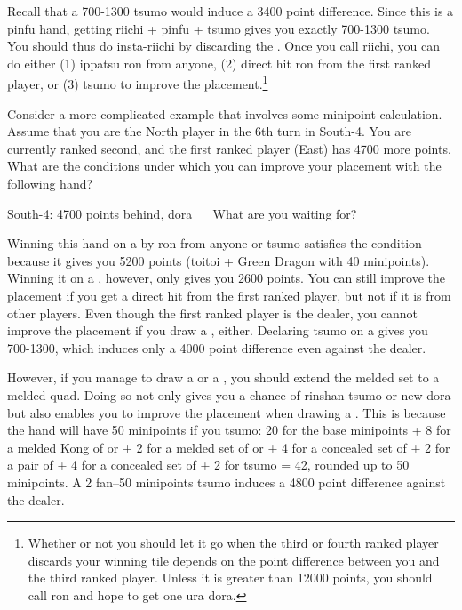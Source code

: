\bigskip
Recall that a 700-1300 {\jap tsumo} would induce a 3400 point difference. Since this is a {\jap pinfu} hand, getting {\jap riichi + pinfu + tsumo} gives you exactly 700-1300 {\jap tsumo}. You should thus do insta-{\jap riichi} by discarding the {\large{}}. Once you call {\jap riichi}, you can do either (1) {\jap ippatsu ron} from anyone, (2) direct hit {\jap ron} from the first ranked player, or (3) {\jap tsumo} to improve the placement.\footnote{Whether or not you should let it go when the third or fourth ranked player discards your winning tile depends on the point difference between you and the third ranked player. Unless it is greater than 12000 points, you should call {\jap ron} and hope to get one {\jap ura dora}.}

\bigskip
Consider a more complicated example that involves some minipoint calculation. Assume that you are the North player in the 6th turn in South-4. You are currently ranked second, and the first ranked player (East) has 4700 more points. 
What are the conditions under which you can improve your placement with the following hand?

\bigskip
\begin{itembox}[r]{South-4: 4700 points behind, {\jap dora} {\large{}}}
\bp
{}\fa\fa~~
\ep
\vspace{-10pt}
What are you waiting for?
\end{itembox}
\noindent Winning this hand on a {\large\fa} by {\jap ron} from anyone or {\jap tsumo} satisfies the condition because it gives you 5200 points ({\jap toitoi} + Green Dragon with 40 minipoints). Winning it on a {\large{}}, however, only gives you 2600 points. You can still improve the placement if you get a direct hit from the first ranked player, but not if it is from other players. Even though the first ranked player is the dealer, you cannot improve the placement if you draw a {\large{}}, either. Declaring {\jap tsumo} on a {\large{}} gives you 700-1300, which induces only a 4000 point difference even against the dealer. 

\bigskip
However, if you manage to draw a {\large{}} or a {\large{}}, you should extend the melded set to a melded quad. Doing so not only gives you a chance of {\jap rinshan tsumo} or new {\jap dora} but also enables you to improve the placement when drawing a {\large{}}. This is because the hand will have 50 minipoints if you {\jap tsumo}: 20 for the base minipoints + 8 for a melded Kong of {\large{}} or {\large{}} + 2 for a melded set of {\large{}} or {\large{}} + 4 for a concealed set of {\large{}} + 2 for a pair of {\large\fa} + 4 for a concealed set of {\large{}} + 2 for {\jap tsumo} = 42, rounded up to 50 minipoints. A 2 {\jap fan}--50 minipoints {\jap tsumo} induces a 4800 point difference against the dealer.

